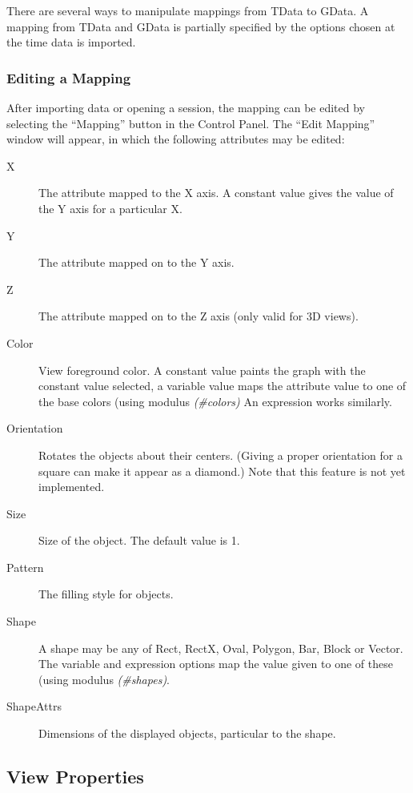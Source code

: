 There are several ways to manipulate mappings from TData to GData. A mapping
from TData and GData is partially specified by the options chosen at the time
data is imported.

\subsubsection{Editing a Mapping}

After importing data or opening a session, the mapping can be edited by
selecting the ``Mapping'' button in the Control Panel. The ``Edit Mapping''
window will appear, in which the following attributes may be edited:

\begin{description}
	\item[X] The attribute mapped to the X axis. A constant value gives the
		value of the Y axis for a particular X.
	\item[Y] The attribute mapped on to the Y axis.
	\item[Z] The attribute mapped on to the Z axis (only valid for 3D views).
	\item[Color] View foreground color. A constant value paints the graph with
		the constant value selected, a variable value maps the attribute value
		to one of the base colors (using modulus {\em (\#colors)} An expression
		works similarly.
	\item[Orientation] Rotates the objects about their centers. (Giving a
		proper orientation for a square can make it appear as a diamond.)
		Note that this feature is not yet implemented.
	\item[Size] Size of the object. The default value is 1.
	\item[Pattern] The filling style for objects.
	\item[Shape] A shape may be any of Rect, RectX, Oval, Polygon, Bar, Block
		or Vector. The variable and expression options map the value
		given to one of these (using modulus {\em (\#shapes)}.
	\item[ShapeAttrs] Dimensions of the displayed objects, particular to the
		shape.
\end{description}


\subsection{View Properties}

